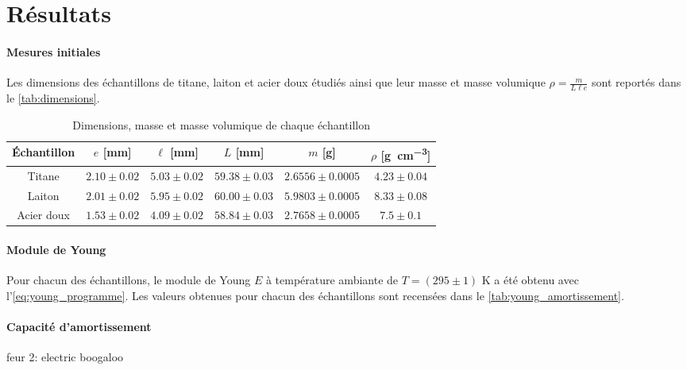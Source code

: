 \section{Résultats}

\paragraph{Mesures initiales} Les dimensions des échantillons de titane, laiton et acier doux étudiés ainsi que leur masse et masse volumique \(\rho = \frac{m}{L \ell e}\) sont reportés dans le \autoref{tab:dimensions}.

\begin{table}[h]
    \centering
    \begin{tabulary}{0.7\linewidth}{c|c c c c c}
        \toprule
        Échantillon & \(e\) [\si{\milli\meter}] & \(\ell\) [\si{\milli\meter}] & \(L\) [\si{\milli\meter}] & \(m\) [\si{\gram}] & \(\rho\) [\si{\gram\per\cubic\centi\meter}] \\
        \midrule
        Titane & \(2.10 \pm 0.02\) & \(5.03 \pm 0.02\) & \(59.38 \pm 0.03\) & \(2.6556 \pm 0.0005\) & \(4.23 \pm 0.04\) \\
        Laiton & \(2.01 \pm 0.02\) & \(5.95 \pm 0.02\) & \(60.00 \pm 0.03\) & \(5.9803 \pm 0.0005\) & \(8.33 \pm 0.08\) \\
        Acier doux & \(1.53 \pm 0.02\) & \(4.09 \pm 0.02\) & \(58.84 \pm 0.03\) & \(2.7658 \pm 0.0005\) & \(7.5 \pm 0.1\) \\
        \bottomrule
    \end{tabulary}
    \caption{Dimensions, masse et masse volumique de chaque échantillon}
    \label{tab:dimensions}
\end{table}

\paragraph{Module de Young} Pour chacun des échantillons, le module de Young \(E\) à température ambiante de \(T = (295 \pm 1)\) \si{\kelvin} a été obtenu avec l'\autoref{eq:young_programme}. Les valeurs obtenues pour chacun des échantillons sont recensées dans le \autoref{tab:young_amortissement}.

\paragraph{Capacité d'amortissement} feur 2: electric boogaloo

